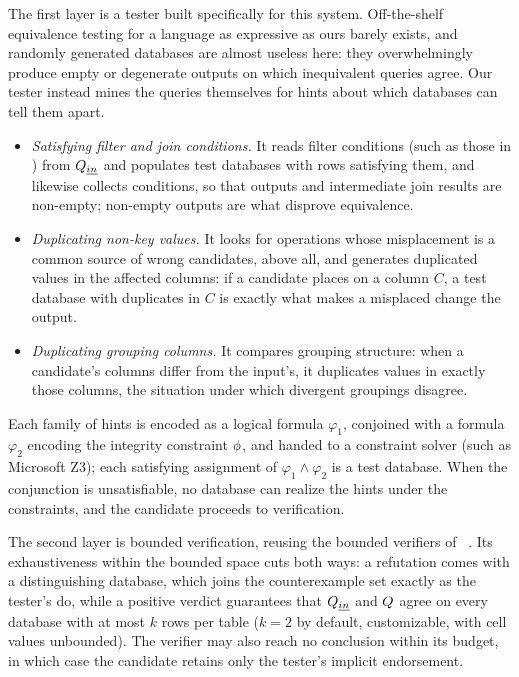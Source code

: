 The first layer is a tester built specifically for this system.
Off-the-shelf equivalence testing for a language as expressive as ours
barely exists, and randomly generated databases are almost useless
here: they overwhelmingly produce empty or degenerate outputs on which
inequivalent queries agree. Our tester instead mines the queries
themselves for hints about which databases can tell them apart.
\begin{itemize}[leftmargin=*]
\item
\emph{Satisfying filter and join conditions.}
It reads filter conditions (such as those in \sqlwherecolor) from
$Q_{\emph{in}}$ and populates test databases with rows satisfying them,
and likewise collects \sqljoincolor conditions, so that outputs and
intermediate join results are non-empty; non-empty outputs are what
disprove equivalence.
\item
\emph{Duplicating non-key values.}
It looks for operations whose misplacement is a common source of wrong
candidates, \sqldistinctcolor above all, and generates duplicated
values in the affected columns: if a candidate places \sqldistinctcolor
on a column $C$, a test database with duplicates in $C$ is exactly
what makes a misplaced \sqldistinctcolor change the output.
\item
\emph{Duplicating grouping columns.}
It compares grouping structure: when a candidate's \sqlgroupbycolor
columns differ from the input's, it duplicates values in exactly those
columns, the situation under which divergent groupings disagree.
\end{itemize}
Each family of hints is encoded as a logical formula $\varphi_1$,
conjoined with a formula $\varphi_2$ encoding the integrity constraint
$\phi$, and handed to a constraint solver (such as
Microsoft Z3); each satisfying assignment of
$\varphi_1 \land \varphi_2$ is a test database. When the conjunction
is unsatisfiable, no database can realize the hints under the
constraints, and the candidate proceeds to verification.

The second layer is bounded verification, reusing the bounded
verifiers of \cosette~\cite{chu2017cosette,wang2018speeding}. Its
exhaustiveness within the bounded space cuts both ways: a refutation
comes with a distinguishing database, which joins the counterexample
set exactly as the tester's do, while a positive verdict guarantees
that $Q_{\emph{in}}$ and $Q$ agree on every database with at most
$k$ rows per table ($k=2$ by default, customizable, with cell values
unbounded). The verifier may also reach no conclusion within its
budget, in which case the candidate retains only the tester's implicit
endorsement.


